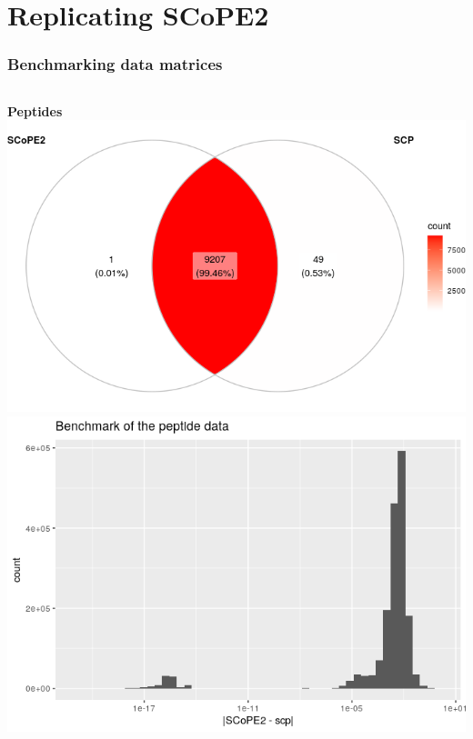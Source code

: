 \documentclass{beamer}
\newcommand{\frametitlesection}[1]{\frametitle{\centering #1 \footnotesize \hspace{0pt plus 1 filll} \insertsection}}
\begin{document}

\section{Replicating SCoPE2}

\begin{frame}
    \frametitlesection{Benchmarking data matrices}
    \begin{columns}
        \begin{column}{0.5\textwidth}
            \textbf{Peptides} \\
            \includegraphics[width=\linewidth]{figs/Benchmark_pep_venn.png} \\
            \includegraphics[width=\linewidth]{figs/Benchmark_pep_err.png}
        \end{column}

\end{columns}
\end{frame}
\end{document}
